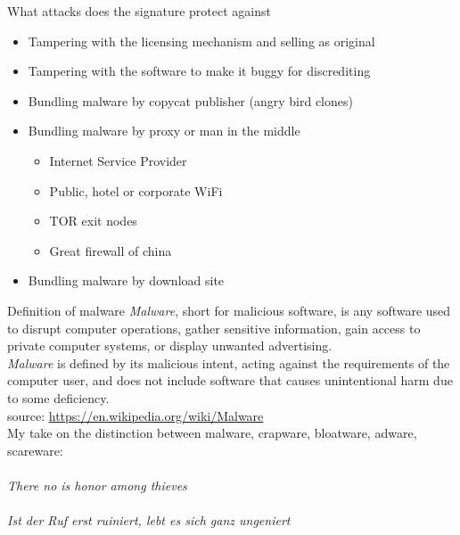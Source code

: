 \documentclass[11pt]{beamer}
\begin{document}
\begin{frame}{What attacks does the signature protect against}
\begin{itemize}
\item Tampering with the licensing mechanism and selling as original
\item Tampering with the software to make it buggy for discrediting
\item Bundling malware by copycat publisher (angry bird clones)
\item Bundling malware by proxy or man in the middle
\begin{itemize}
\item Internet Service Provider
\item Public, hotel or corporate WiFi
\item TOR exit nodes
\item Great firewall of china
\end{itemize}
\item Bundling malware by download site
\end{itemize}
\end{frame}

\begin{frame}{Definition of malware}
\emph{Malware}, short for malicious software, is any software used to disrupt computer operations, gather sensitive information, gain access to private computer systems, or display unwanted advertising.
\\[0.2cm]
\emph{Malware} is defined by its malicious intent, acting against the requirements of the computer user, and does not include software that causes unintentional harm due to some deficiency.
\\[0.1cm]
source: \href{https://en.wikipedia.org/wiki/Malware}{https://en.wikipedia.org/wiki/Malware}
\\[0.5cm]
\pause
My take on the distinction between malware, crapware, bloatware, adware, scareware:\\
\\[0.1cm]
\emph{There no is honor among thieves}\\
\\[0.1cm]
\emph{Ist der Ruf erst ruiniert, lebt es sich ganz ungeniert}
\end{frame}
\end{document}
